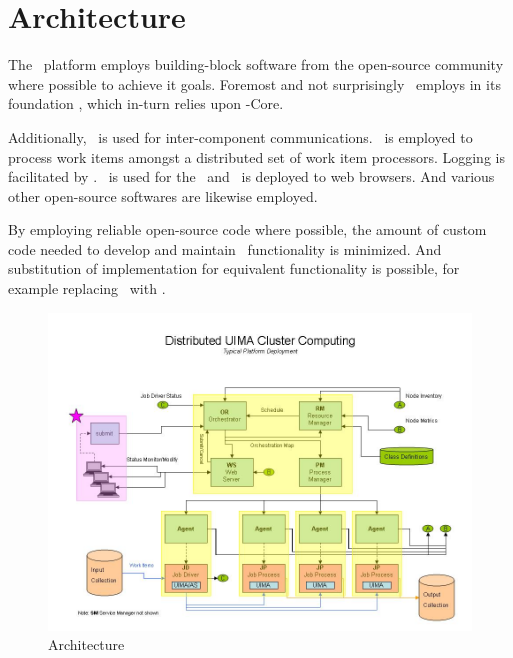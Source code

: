     \section{Architecture}
    
    The \varDUCC~platform employs building-block software from the open-source community
    where possible to achieve it goals. Foremost and not surprisingly \varDUCC~employs in
    its foundation \varUIMAAS, which in-turn relies upon \varUIMA-Core.
    
    Additionally, \varCamel~is used for inter-component communications.
    \varActiveMQ~is employed to process work items amongst a distributed set of work item processors.
    Logging is facilitated by \varLogger. \varJetty~is used for the \varWebServer~and \varjQuery~is deployed
    to web browsers.  And various other open-source softwares are likewise employed.
    
    By employing reliable open-source code where possible, the amount of custom code needed
    to develop and maintain \varDUCC~functionality is minimized. And substitution of implementation
    for equivalent functionality is possible, for example replacing \varApacheActiveMQ~with 
    \varIBMWebSphereMQ.
    
    \begin{figure}[h]
    \centering
    \includegraphics[width=6.5in]{images/ducc-arch.jpg}
    \caption{\varDUCC Architecture}
    \label{fig:\varDUCC-Architecture}
    \end{figure}

    \section{\varJobs}

